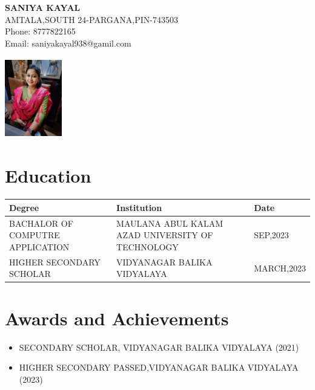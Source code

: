 \documentclass[a4paper,10pt]{article}
\begin{document}
\begin{minipage}{0.7\textwidth}
    \textbf{\LARGE SANIYA KAYAL} \\
    AMTALA,SOUTH 24-PARGANA,PIN-743503\\
    Phone: 8777822165 \\
    Email: saniyakayal938@gamil.com
\end{minipage}
\begin{minipage}{0.3\textwidth}
    \begin{flushright}
        \includegraphics[width=2.5cm,height=3.5cm]{resume pic.jpg}
    \end{flushright}
\end{minipage}

\vspace{1cm}

\section*{Education}
\begin{tabular}{|p{5cm}|p{6cm}|p{4cm}|}
    \hline
    \textbf{Degree} & \textbf{Institution} & \textbf{Date} \\
    \hline
    BACHALOR OF COMPUTRE APPLICATION & MAULANA ABUL KALAM AZAD UNIVERSITY OF TECHNOLOGY & SEP,2023\\
    \hline
    HIGHER SECONDARY SCHOLAR  & VIDYANAGAR BALIKA VIDYALAYA & MARCH,2023 \\
    \hline
\end{tabular}

\vspace{1cm}

\section*{Awards and Achievements}
\begin{itemize}

    \item SECONDARY SCHOLAR, VIDYANAGAR BALIKA VIDYALAYA (2021)
    \item HIGHER SECONDARY PASSED,VIDYANAGAR BALIKA VIDYALAYA (2023)
\end{itemize}
\end{document}
